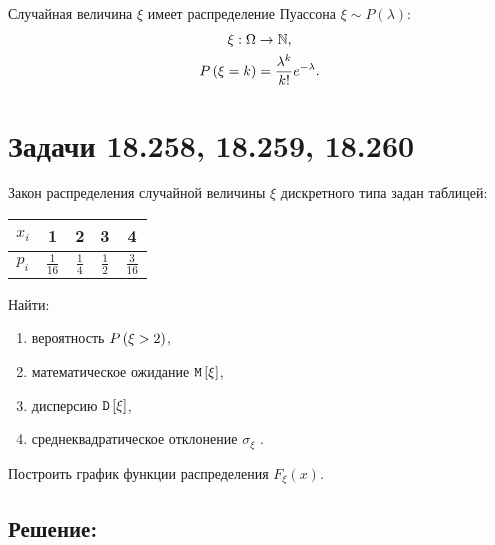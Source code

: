 Случайная величина $\xi$ имеет распределение Пуассона $\xi \sim P(\lambda)$:
\begin{gather}
    \xi : \Omega \rightarrow \mathbb{N}, \\
    P \left ( \xi = k \right ) = \frac{\lambda^k}{k!} e^{-\lambda} .
\end{gather}

\section*{Задачи 18.258, 18.259, 18.260}

Закон распределения случайной величины $\xi$ дискретного типа задан таблицей:
\begin{center}
    \begin{tabular}{|c|c|c|c|c|}
        \hline
        $x_i$ & 1              & 2             & 3             & 4              \\
        \hline
        $p_i$ & $\frac{1}{16}$ & $\frac{1}{4}$ & $\frac{1}{2}$ & $\frac{3}{16}$ \\
        \hline
    \end{tabular}
\end{center}

Найти:
\begin{enumerate}
    \item вероятность $P \left ( \xi > 2 \right )$,
    \item математическое ожидание $\mathtt{M} \left [ \xi \right ]$,
    \item дисперсию $\mathtt{D} \left [ \xi \right ]$,
    \item среднеквадратическое отклонение $\sigma_\xi$ .
\end{enumerate}

Построить график функции распределения $F_\xi(x)$.

\subsection*{Решение:}

